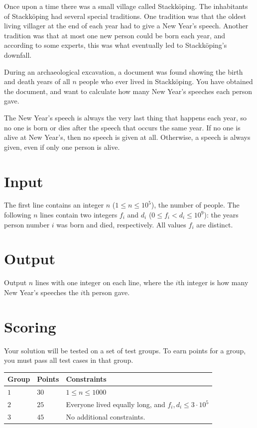Once upon a time there was a small village called Stackköping.
The inhabitants of Stackköping had several special traditions.
One tradition was that the oldest living villager at the end of each year had to give a New Year's speech.
Another tradition was that at most one new person could be born each year, and according to some experts, this was what eventually led to Stackköping's downfall.

During an archaeological excavation, a document was found showing the birth and death years of all $n$ people who ever lived in Stackköping.
You have obtained the document, and want to calculate how many New Year's speeches each person gave.

The New Year's speech is always the very last thing that happens each year, so no one is born or dies after the speech that occurs the same year.
If no one is alive at New Year's, then no speech is given at all.
Otherwise, a speech is always given, even if only one person is alive.

\section*{Input}

The first line contains an integer $n$ ($1 \le n \le 10^5$), the number of people.
The following $n$ lines contain two integers $f_i$ and $d_i$ ($0 \le f_i < d_i \le 10^9$): the years person number $i$ was born and died, respectively.
All values $f_i$ are distinct.

\section*{Output}
Output $n$ lines with one integer on each line, where the $i$th integer is how many New Year's speeches the $i$th person gave.

\section*{Scoring}
Your solution will be tested on a set of test groups. To earn points for a group, you must pass all test cases in that group.

\noindent
\begin{tabular}{| l | l | p{12cm} |}
  \hline
  \textbf{Group} & \textbf{Points} & \textbf{Constraints} \\ \hline
  $1$    & $30$      & $1 \le n \le 1000$ \\ \hline
  $2$    & $25$      & Everyone lived equally long, and $f_i, d_i \le 3\cdot 10^5$ \\ \hline
  $3$    & $45$      & No additional constraints.  \\ \hline
\end{tabular}

